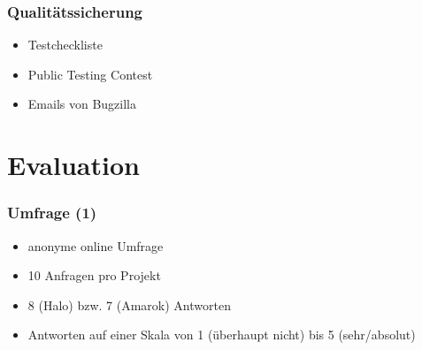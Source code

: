 \documentclass{beamer}
\begin{document}
\begin{frame}
\frametitle{Qualit\"atssicherung}
\begin{itemize}
 \item Testcheckliste
 \item Public Testing Contest
 \item Emails von Bugzilla
\end{itemize}
\end{frame}

\section{Evaluation}

\begin{frame}
\frametitle{Umfrage (1)}
\begin{itemize}
 \item anonyme online Umfrage
 \item 10 Anfragen pro Projekt
 \item 8 (Halo) bzw. 7 (Amarok) Antworten
 \item Antworten auf einer Skala von 1 (\"uberhaupt nicht) bis 5 (sehr/absolut)
\end{itemize}
\end{frame}
\end{document}
